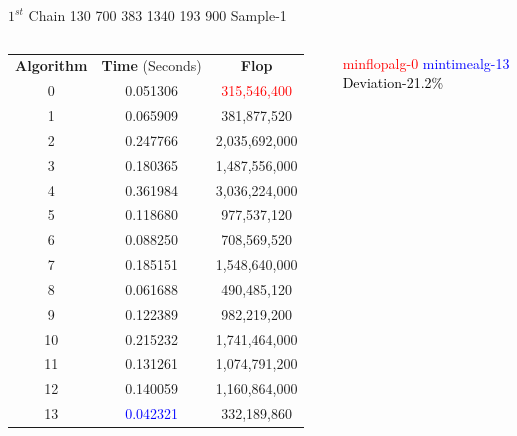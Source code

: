 \documentclass[10pts]{beamer}
\begin{document}
	   \begin{frame}{$1^{st}$ Chain 130 700 383 1340 193 900 \hspace{75pt}   Sample-1  }
	   	\begin{columns}
	   		
	   		\begin{tabular}{c | c | c}
	   			\textbf{Algorithm}  & \textbf{Time} (Seconds) & \textbf{Flop}\\		
	   			0	&   0.051306	&	\textcolor{red}{315,546,400}\\
	   			1	&	0.065909 	&	381,877,520\\
	   			2 	&	0.247766 	&	2,035,692,000\\
	   			3 	&	0.180365 	&	1,487,556,000 \\
	   			4 	&	0.361984 	&	3,036,224,000\\
	   			5 	&	0.118680 	&	977,537,120\\
	   			6	&    0.088250 	&	708,569,520\\
	   			7 	&	0.185151 	&	1,548,640,000\\
	   			8 	&	0.061688 	&	490,485,120\\
	   			9 	&	0.122389 	&	982,219,200\\
	   			10 	&	0.215232 	&	1,741,464,000\\
	   			11 	&	0.131261 	&	1,074,791,200\\
	   			12 	&	0.140059 	&	1,160,864,000\\
	   			13 	&	\textcolor{blue}{0.042321} 	&	332,189,860	
	   			
	   		\end{tabular}
	   		
	   		
	   		\textcolor{red}{min\textunderscore flop\textunderscore alg-0}
	   		\textcolor{blue}{min\textunderscore time\textunderscore alg-13}
	   		\textcolor{black}{Deviation-21.2\%}
	   	\end{columns}
	   \end{frame} 
	   
	   
	  
	   
	   		
\end{document}
